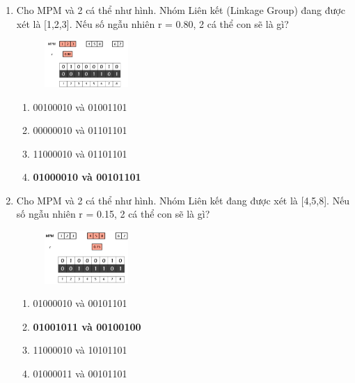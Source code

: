 \documentclass{book}
\begin{document}
\begin{enumerate}
    \item Cho MPM và 2 cá thể như hình. Nhóm Liên kết (Linkage Group) đang được xét là [1,2,3]. Nếu số ngẫu nhiên r = 0.80, 2 cá thể con sẽ là gì?
    \begin{figure}[H]
        \centering
        \includegraphics[width=0.3\textwidth]{images/quiz5_3.png}
    \end{figure}
    \begin{multicols}{2}
        \begin{enumerate}[label=\Alph*]
            \item 00100010 và 01001101
            \item 00000010 và 01101101
            \item 11000010 và 01101101
            \item \textbf{01000010 và 00101101}
        \end{enumerate}
    \end{multicols}

    \item Cho MPM và 2 cá thể như hình. Nhóm Liên kết đang được xét là [4,5,8]. Nếu số ngẫu nhiên r = 0.15, 2 cá thể con sẽ là gì?
    \begin{figure}[H]
        \centering
        \includegraphics[width=0.3\textwidth]{images/quiz5_4.png}
    \end{figure}
    \begin{multicols}{2}
        \begin{enumerate}[label=\Alph*]
            \item 01000010 và 00101101
            \item \textbf{01001011 và 00100100}
            \item 11000010 và 10101101
            \item 01000011 và 00101101
        \end{enumerate}
    \end{multicols}


\end{enumerate}
\end{document}

